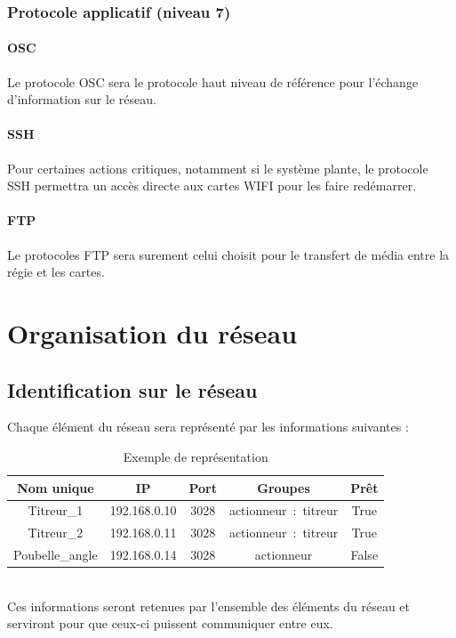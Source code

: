 \subsubsection{Protocole applicatif (niveau 7)}
\paragraph{OSC}\rt Le protocole OSC sera le protocole haut niveau de référence pour l'échange d'information sur le réseau.
\paragraph{SSH}\rt Pour certaines actions critiques, notamment si le système plante, le protocole SSH permettra un accès directe aux cartes WIFI pour les faire redémarrer.
\paragraph{FTP}\rt Le protocoles FTP sera surement celui choisit pour le transfert de média entre la régie et les cartes.

\section{Organisation du réseau}

\subsection{Identification sur le réseau}
Chaque élément du réseau sera représenté par les informations suivantes :
\begin{table}[htbp]
\centering
\begin{adjustbox}{center}
\small
\begin{tabularx}{\textwidth}{|c|C|c|C|c|}
\hline
\textbf{Nom unique} & \textbf{IP} & \textbf{Port} & \textbf{Groupes} & \textbf{Prêt} \tabularnewline
\hline
\hline
Titreur\_1 & 192.168.0.10 & 3028 & actionneur~:~titreur & True \tabularnewline
\hline
Titreur\_2 & 192.168.0.11 & 3028 & actionneur~:~titreur & True \tabularnewline
\hline
Poubelle\_angle & 192.168.0.14 & 3028 & actionneur & False \tabularnewline
\hline
\end{tabularx}
\normalsize
\end{adjustbox}
\label{tab:ARP table example}
\caption{Exemple de représentation}
\end{table}~\\
Ces informations seront retenues par l'ensemble des éléments du réseau et serviront pour que ceux-ci puissent communiquer entre eux.

